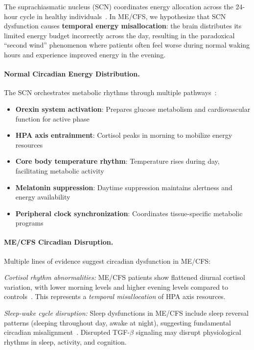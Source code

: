 \begin{hypothesis}
\label{hyp:circadian-energy-distribution}

The suprachiasmatic nucleus (SCN) coordinates energy allocation across the 24-hour cycle in healthy individuals~\cite{kalsbeek2012suprachiasmatic,van2012circadian}. In ME/CFS, we hypothesize that SCN dysfunction causes \textbf{temporal energy misallocation}: the brain distributes its limited energy budget incorrectly across the day, resulting in the paradoxical ``second wind'' phenomenon where patients often feel worse during normal waking hours and experience improved energy in the evening.

\paragraph{Normal Circadian Energy Distribution.}
The SCN orchestrates metabolic rhythms through multiple pathways~\cite{van2012circadian}:
\begin{itemize}
  \item \textbf{Orexin system activation}: Prepares glucose metabolism and cardiovascular function for active phase
  \item \textbf{HPA axis entrainment}: Cortisol peaks in morning to mobilize energy resources
  \item \textbf{Core body temperature rhythm}: Temperature rises during day, facilitating metabolic activity
  \item \textbf{Melatonin suppression}: Daytime suppression maintains alertness and energy availability
  \item \textbf{Peripheral clock synchronization}: Coordinates tissue-specific metabolic programs
\end{itemize}

\paragraph{ME/CFS Circadian Disruption.}
Multiple lines of evidence suggest circadian dysfunction in ME/CFS:

\textit{Cortisol rhythm abnormalities:}
ME/CFS patients show flattened diurnal cortisol variation, with lower morning levels and higher evening levels compared to controls~\cite{nater2008stress,papadopoulos2009hypothalamus}. This represents a \textit{temporal misallocation} of HPA axis resources.

\textit{Sleep-wake cycle disruption:}
Sleep dysfunctions in ME/CFS include sleep reversal patterns (sleeping throughout day, awake at night), suggesting fundamental circadian misalignment~\cite{mccarthy2022circadian}. Disrupted TGF-$\beta$ signaling may disrupt physiological rhythms in sleep, activity, and cognition.


\end{hypothesis}
